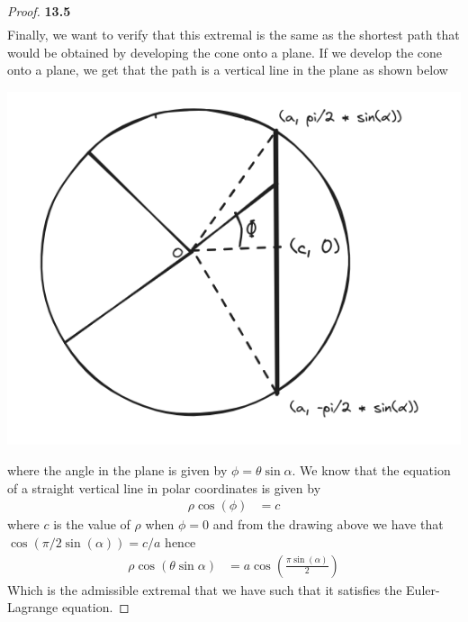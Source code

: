 \documentclass[11pt]{article}
\theoremstyle{definition}
\begin{document}
\begin{proof}{\textbf{13.5}}
\begin{align*}
    \end{align*}
    \cleardoublepage
    Finally, we want to verify that this extremal is the same as the shortest
    path that would be obtained by developing the cone onto a plane.
    If we develop the cone onto a plane, we get that the path is a vertical
    line in the plane as shown below
    \begin{center}
        \includegraphics[scale=0.4]{ch13-5_1.png}
    \end{center}
    where the angle in the plane is given by $\phi = \theta \sin\alpha$.
    We know that the equation of a straight vertical line in polar coordinates
    is given by
    \begin{align*}
        \rho\cos(\phi) &= c
    \end{align*}
    where $c$ is the value of $\rho$ when $\phi = 0$ and from the drawing
    above we have that $\cos(\pi/2\sin(\alpha)) = c/a$ hence 
    \begin{align*}
        \rho\cos(\theta\sin\alpha) &= a\cos(\frac{\pi\sin(\alpha)}{2})
    \end{align*}
    Which is the admissible extremal that we have such that it satisfies
    the Euler-Lagrange equation.
\end{proof}
\cleardoublepage
\end{document}
